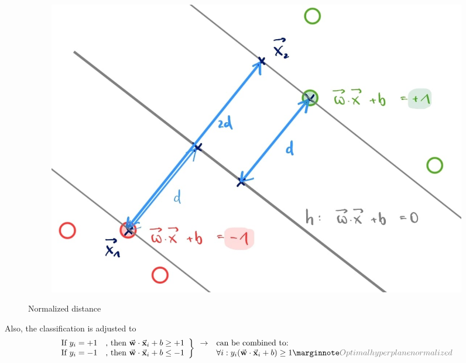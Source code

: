 \begin{figure}[H]
  \centering
  \begin{subfigure}{0.4\textwidth}
    \centering
    \includegraphics[width=1\textwidth]{assets/svm/b__distance_1.png} 
  \end{subfigure}\hspace*{0.05\textwidth}
  \begin{subfigure}{0.5\textwidth}

  \end{subfigure}
  \caption{Normalized distance}
  \label{fig:5_distance_to_h_normalized}
\end{figure}

Also, the classification is adjusted to 
\begin{align*}
  \left.\begin{array}{ll}
    \text{If } y_i = +1 & \text{, then } \cv{w}\cdot\cv{x}_i + b \geq +1\\
    \text{If } y_i = -1 & \text{, then } \cv{w}\cdot\cv{x}_i + b \leq -1
  \end{array}\right\}
  \begin{array}{ll}\rightarrow&\text{can be combined to:}\\
    &\forall i: y_i(\cv{w}\cdot\cv{x}_i + b) \geq 1\sidenote{Optimal hyperplane normalized}
  \end{array}
\end{align*}

